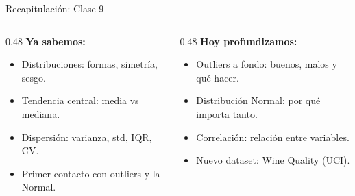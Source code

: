\documentclass[aspectratio=169, 11pt]{beamer}
\begin{document}
\begin{frame}[shrink=5]{Recapitulación: Clase 9}
  \vspace{-4pt}
  \begin{columns}[T]
    \begin{column}{0.48\textwidth}
      {\footnotesize\bfseries\color{arcaDark} Ya sabemos:}
      \vspace{4pt}

      {\footnotesize
      \begin{itemize}\setlength{\itemsep}{4pt}
        \item[{\color{codeGreen}\faCheckCircle}]
          Distribuciones: formas, simetría, sesgo.
        \item[{\color{codeGreen}\faCheckCircle}]
          Tendencia central: media vs mediana.
        \item[{\color{codeGreen}\faCheckCircle}]
          Dispersión: varianza, std, IQR, CV.
        \item[{\color{codeGreen}\faCheckCircle}]
          Primer contacto con outliers y la Normal.
      \end{itemize}
      }
    \end{column}

    \begin{column}{0.48\textwidth}
      {\footnotesize\bfseries\color{arcaRed} Hoy profundizamos:}
      \vspace{4pt}

      {\footnotesize
      \begin{itemize}\setlength{\itemsep}{4pt}
        \item[{\color{arcaRed}\faArrowRight}]
          Outliers a fondo: buenos, malos y qué hacer.
        \item[{\color{arcaRed}\faArrowRight}]
          Distribución Normal: por qué importa tanto.
        \item[{\color{arcaRed}\faArrowRight}]
          Correlación: relación entre variables.
        \item[{\color{arcaRed}\faArrowRight}]
          Nuevo dataset: Wine Quality (UCI).
      \end{itemize}
      }
    \end{column}
  \end{columns}
\end{frame}
\end{document}
